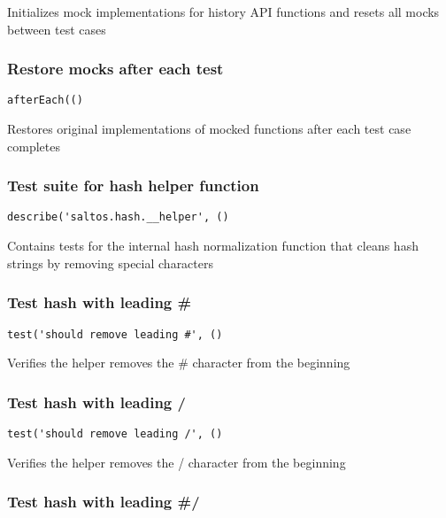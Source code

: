 \documentclass[a4paper]{article}
\begin{document}
Initializes mock implementations for history API functions
and resets all mocks between test cases

\hypertarget{toc191}{}
\subsubsection{Restore mocks after each test}

\begin{lstlisting}
afterEach(()
\end{lstlisting}

Restores original implementations of mocked functions
after each test case completes

\hypertarget{toc192}{}
\subsubsection{Test suite for hash helper function}

\begin{lstlisting}
describe('saltos.hash.__helper', ()
\end{lstlisting}

Contains tests for the internal hash normalization function
that cleans hash strings by removing special characters

\hypertarget{toc193}{}
\subsubsection{Test hash with leading \#}

\begin{lstlisting}
test('should remove leading #', ()
\end{lstlisting}

Verifies the helper removes the \# character from the beginning

\hypertarget{toc194}{}
\subsubsection{Test hash with leading /}

\begin{lstlisting}
test('should remove leading /', ()
\end{lstlisting}

Verifies the helper removes the / character from the beginning

\hypertarget{toc195}{}
\subsubsection{Test hash with leading \#/}
\end{document}
